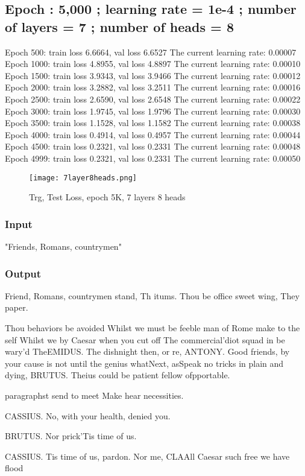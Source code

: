\documentclass[conference]{IEEEtran}
\begin{document}
\subsection{Epoch : 5,000 ; learning rate = 1e-4 ; number of layers = 7 ; number of heads = 8}
Epoch 500: train loss 6.6664, val loss 6.6527
The current learning rate: 0.00007
Epoch 1000: train loss 4.8955, val loss 4.8897
The current learning rate: 0.00010
Epoch 1500: train loss 3.9343, val loss 3.9466
The current learning rate: 0.00012
Epoch 2000: train loss 3.2882, val loss 3.2511
The current learning rate: 0.00016
Epoch 2500: train loss 2.6590, val loss 2.6548
The current learning rate: 0.00022
Epoch 3000: train loss 1.9745, val loss 1.9796
The current learning rate: 0.00030
Epoch 3500: train loss 1.1528, val loss 1.1582
The current learning rate: 0.00038
Epoch 4000: train loss 0.4914, val loss 0.4957
The current learning rate: 0.00044
Epoch 4500: train loss 0.2321, val loss 0.2331
The current learning rate: 0.00048
Epoch 4999: train loss 0.2321, val loss 0.2331
The current learning rate: 0.00050

\begin{figure}[H]
    \centering
    \texttt{[image: 7layer8heads.png]}
    \caption{Trg, Test Loss, epoch 5K, 7 layers 8 heads}
    \label{fig:epoch}
\end{figure}
\subsubsection{Input}
"Friends, Romans, countrymen"
\subsubsection{Output}
Friend, Romans, countrymen stand,
Th itums.
Thou be office sweet wing,
They paper.

Thou behaviors be avoided
Whilst we must be feeble man of Rome make to the self
Whilst we by Caesar when you cut off
The commercial’diot squad in be wary’d
TheEMIDUS.
The dishnight then, or re,
ANTONY.
Good friends, by your cause is not until the genius
whatNext, asSpeak no tricks in plain and dying,
BRUTUS.
Theius could be patient fellow ofpportable.

paragraphst send to meet
Make hear necessities.

CASSIUS.
No, with your health, denied you.

BRUTUS.
Nor prick’Tis time of us.

CASSIUS.
Tis time of us, pardon.
Nor me, CLAAll Caesar such free we have flood
\end{document}
